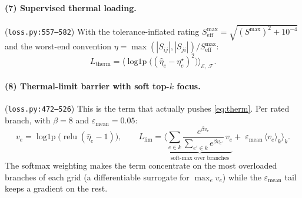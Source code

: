 \documentclass[11pt]{article}
\newcommand{\pred}[1]{\widehat{#1}}
\newcommand{\code}[1]{\texttt{\small #1}}
\newcommand{\relu}{\operatorname{relu}}
\newcommand{\logp}{\operatorname{log1p}}
\begin{document}
\paragraph{(7) Supervised thermal loading.}
(\code{loss.py:557--582}) With the tolerance-inflated rating
$S^{\max}_{\mathrm{eff}}=\sqrt{(S^{\max})^2+10^{-4}}$ and the worst-end convention
$\eta=\max(|S_{ij}|,|S_{ji}|)/S^{\max}_{\mathrm{eff}}$:
\begin{equation}
L_{\mathrm{therm}}=\Big\langle \logp\!\big((\pred\eta_e-\eta^\star_e)^2\big)\Big\rangle_{\mathcal{E},\,\mathcal{F}} .
\label{eq:sfm-loading}
\end{equation}

\paragraph{(8) Thermal-limit barrier with soft top-$k$ focus.}
(\code{loss.py:472--526}) This is the term that actually pushes \eqref{eq:therm}. Per rated
branch, with $\beta=8$ and $\varepsilon_{\mathrm{mean}}=0.05$:
\begin{equation}
\boxed{\;
v_e=\logp\!\big(\relu(\pred\eta_e-1)\big),
\qquad
L_{\mathrm{lim}}
=\Big\langle
\underbrace{\sum_{e\in k}\frac{e^{\beta v_e}}{\sum_{e'\in k}e^{\beta v_{e'}}}\,v_e}_{\text{soft-max over branches}}
+\;\varepsilon_{\mathrm{mean}}\,\langle v_e\rangle_k
\Big\rangle_{k} .
\;}
\label{eq:sfm-thermlim}
\end{equation}
The softmax weighting makes the term concentrate on the most overloaded branches of each
grid (a differentiable surrogate for $\max_e v_e$) while the $\varepsilon_{\mathrm{mean}}$
tail keeps a gradient on the rest.
\end{document}
